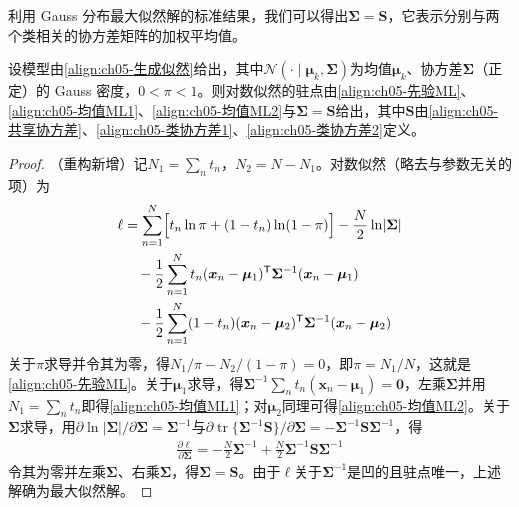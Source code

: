 \documentclass[../../main.tex]{subfiles}
\begin{document}
利用 Gauss 分布最大似然解的标准结果，我们可以得出$\boldsymbol{\Sigma}=\boldsymbol{S}$，它表示分别与两个类相关的协方差矩阵的加权平均值。

\begin{proposition}[生成式模型的最大似然解]\label{proposition:ch05-生成模型最大似然解}
设模型由\eqref{align:ch05-生成似然}给出，其中$\mathcal{N}(\cdot\mid\boldsymbol{\mu}_k,\boldsymbol{\Sigma})$为均值$\boldsymbol{\mu}_k$、协方差$\boldsymbol{\Sigma}$（正定）的 Gauss 密度，$0<\pi<1$。则对数似然的驻点由\eqref{align:ch05-先验ML}、\eqref{align:ch05-均值ML1}、\eqref{align:ch05-均值ML2}与$\boldsymbol{\Sigma}=\boldsymbol{S}$给出，其中$\boldsymbol{S}$由\eqref{align:ch05-共享协方差}、\eqref{align:ch05-类协方差1}、\eqref{align:ch05-类协方差2}定义。
\end{proposition}

\begin{proof}
（重构新增）记$N_1=\sum_n t_n$，$N_2=N-N_1$。对数似然（略去与参数无关的项）为
\begin{align}
  \ell&=\sum_{n=1}^{N}\Bigl[t_n\ln\pi+(1-t_n)\ln(1-\pi)\Bigr]-\frac{N}{2}\ln\lvert\boldsymbol{\Sigma}\rvert
  \nonumber\\
  &\quad-\frac{1}{2}\sum_{n=1}^{N}t_n(\boldsymbol{x}_n-\boldsymbol{\mu}_1)^{\mathsf{T}}\boldsymbol{\Sigma}^{-1}(\boldsymbol{x}_n-\boldsymbol{\mu}_1)
  \nonumber\\
  &\quad-\frac{1}{2}\sum_{n=1}^{N}(1-t_n)(\boldsymbol{x}_n-\boldsymbol{\mu}_2)^{\mathsf{T}}\boldsymbol{\Sigma}^{-1}(\boldsymbol{x}_n-\boldsymbol{\mu}_2)
\end{align}
关于$\pi$求导并令其为零，得$N_1/\pi-N_2/(1-\pi)=0$，即$\pi=N_1/N$，这就是\eqref{align:ch05-先验ML}。关于$\boldsymbol{\mu}_1$求导，得$\boldsymbol{\Sigma}^{-1}\sum_n t_n(\boldsymbol{x}_n-\boldsymbol{\mu}_1)=\boldsymbol{0}$，左乘$\boldsymbol{\Sigma}$并用$N_1=\sum_n t_n$即得\eqref{align:ch05-均值ML1}；对$\boldsymbol{\mu}_2$同理可得\eqref{align:ch05-均值ML2}。关于$\boldsymbol{\Sigma}$求导，用$\partial\ln\lvert\boldsymbol{\Sigma}\rvert/\partial\boldsymbol{\Sigma}=\boldsymbol{\Sigma}^{-1}$与$\partial\operatorname{tr}\{\boldsymbol{\Sigma}^{-1}\boldsymbol{S}\}/\partial\boldsymbol{\Sigma}=-\boldsymbol{\Sigma}^{-1}\boldsymbol{S}\boldsymbol{\Sigma}^{-1}$，得
\begin{align}
  \frac{\partial\ell}{\partial\boldsymbol{\Sigma}}=-\frac{N}{2}\boldsymbol{\Sigma}^{-1}+\frac{N}{2}\boldsymbol{\Sigma}^{-1}\boldsymbol{S}\boldsymbol{\Sigma}^{-1}
\end{align}
令其为零并左乘$\boldsymbol{\Sigma}$、右乘$\boldsymbol{\Sigma}$，得$\boldsymbol{\Sigma}=\boldsymbol{S}$。由于$\ell$关于$\boldsymbol{\Sigma}^{-1}$是凹的且驻点唯一，上述解确为最大似然解。
\end{proof}
\end{document}
